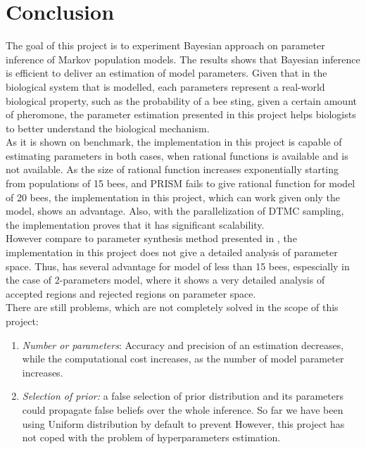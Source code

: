 \documentclass[12pt]{article}
\theoremstyle{definition}
\begin{document}
\section{Conclusion}
The goal of this project is to experiment Bayesian approach on parameter
inference of Markov population models. The results shows that Bayesian inference
is efficient to deliver an estimation of model parameters. Given that in the
biological system that is modelled, each parameters represent a real-world
biological property, such as the probability of a bee sting, given a certain
amount of pheromone, the parameter estimation presented in this project helps
biologists to better understand the biological mechanism.\\
As it is shown on benchmark, the implementation in this project is capable of
estimating parameters in both cases, when rational functions is available and is
not available. As the size of rational function increases exponentially starting
from populations of 15 bees, and PRISM fails to give rational function for model
of 20 bees, the implementation in this project, which can work given only the
model, shows an advantage. Also, with the parallelization of DTMC sampling, the
implementation proves that it has significant scalability.\\
However compare to parameter synthesis method presented in \cite{hajnal2019data}, the
implementation in this project does not give a detailed analysis of parameter
space. Thus, \cite{hajnal2019data} has several advantage for model of less than
15 bees, espescially in the case of 2-parameters model, where it shows a very
detailed analysis of accepted regions and rejected regions on parameter space.\\
There are still problems, which are not completely solved in the scope of this project:
\begin{enumerate}
\item \textit{Number or parameters}: Accuracy and precision of an estimation
  decreases, while the computational cost increases, as the number of model
  parameter increases.
\item \textit{Selection of prior:} a false selection of prior distribution and
  its parameters could propagate false beliefs over the whole inference. So far
  we have been using Uniform distribution by default to prevent 
  However, this project has not coped with the problem of hyperparameters
  estimation.
\end{enumerate}





\newpage
\printbibliography
\end{document}
